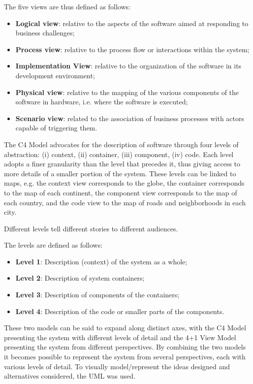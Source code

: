 The five views are thus defined as follows:
\begin{itemize}
   \item \textbf{Logical view}: relative to the aspects of the software aimed at responding to business challenges;
   \item \textbf{Process view}: relative to the process flow or interactions within the system;
   \item \textbf{Implementation View}: relative to the organization of the software in its development environment;
   \item \textbf{Physical view}: relative to the mapping of the various components of the software in hardware, i.e. where the software is executed;
   \item \textbf{Scenario view}: related to the association of business processes with actors capable of triggering them.
\end{itemize}

The C4 Model advocates for the description of software through four levels of abstraction:
(i) context, (ii) container, (iii) component, (iv) code. Each level adopts a finer granularity than the level that precedes it, thus giving access to more details of a smaller portion of the system.
These levels can be linked to maps, e.g. the context view corresponds to the globe, the container corresponds to the map of each continent, the component view corresponds to the map of each country, and the code view to the map of roads and neighborhoods in each city.

Different levels tell different stories to different audiences.

The levels are defined as follows:

\begin{itemize}
   \item \textbf{Level 1}: Description (context) of the system as a whole;
   \item \textbf{Level 2}: Description of system containers;
   \item \textbf{Level 3}: Description of components of the containers;
   \item \textbf{Level 4}: Description of the code or smaller parts of the components.
\end{itemize}

These two models can be said to expand along distinct axes, with the C4 Model presenting the system with different levels of detail and the 4+1 View Model presenting the system from different perspectives. By combining the two models it becomes possible to represent the system from several perspectives, each with various levels of detail.
To visually model/represent the ideas designed and alternatives considered, the \gls{UML} was used.


